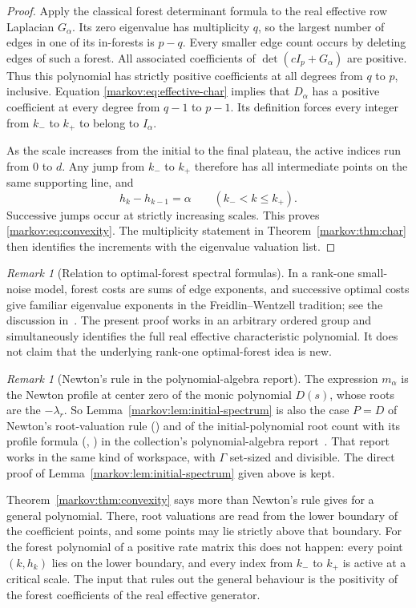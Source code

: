 \documentclass[11pt]{article}
\numberwithin{equation}{section}
\theoremstyle{definition}
\theoremstyle{remark}
\newtheorem{remark}[theorem]{Remark}
\begin{document}
\begin{proof}
Apply the classical forest determinant formula to the real effective row
Laplacian $G_\alpha$. Its zero eigenvalue has multiplicity $q$, so the largest
number of edges in one of its in-forests is $p-q$. Every smaller edge count
occurs by deleting edges of such a forest. All associated coefficients of
$\det(cI_p+G_\alpha)$ are positive. Thus this polynomial has strictly positive
coefficients at all degrees from $q$ to $p$, inclusive. Equation
\eqref{markov:eq:effective-char} implies that $D_\alpha$ has a positive coefficient
at every degree from $q-1$ to $p-1$. Its definition forces every integer from
$k_-$ to $k_+$ to belong to $I_\alpha$.

As the scale increases from the initial to the final plateau, the active indices
run from $0$ to $d$. Any jump from $k_-$ to $k_+$ therefore has all intermediate
points on the same supporting line, and
\[
 h_k-h_{k-1}=\alpha\qquad(k_-<k\le k_+).
\]
Successive jumps occur at strictly increasing scales. This proves
\eqref{markov:eq:convexity}. The multiplicity statement in Theorem~\ref{markov:thm:char}
then identifies the increments with the eigenvalue valuation list.
\end{proof}

\begin{remark}[Relation to optimal-forest spectral formulas]
In a rank-one small-noise model, forest costs are sums of edge exponents, and
successive optimal costs give familiar eigenvalue exponents in the
Freidlin--Wentzell tradition; see the discussion in~\cite{GC}. The present proof
works in an arbitrary ordered group and simultaneously identifies the full
real effective characteristic polynomial. It does not claim that the underlying
rank-one optimal-forest idea is new.
\end{remark}

\begin{remark}[Newton's rule in the polynomial-algebra report]\label{markov:rem:newton}
The expression $m_\alpha$ is the Newton profile at center zero of the monic
polynomial $D(s)$, whose roots are the $-\lambda_r$. So
Lemma~\ref{markov:lem:initial-spectrum} is also the case $P=D$ of Newton's
root-valuation rule () and of the initial-polynomial
root count with its profile formula (,
) in the collection's polynomial-algebra
report~\cite{CollPoly}. That report works in the same kind of workspace, with
$\Gamma$ set-sized and divisible. The direct proof of
Lemma~\ref{markov:lem:initial-spectrum} given above is kept.

Theorem~\ref{markov:thm:convexity} says more than Newton's rule gives for a
general polynomial. There, root valuations are read from the lower boundary of
the coefficient points, and some points may lie strictly above that boundary.
For the forest polynomial of a positive rate matrix this does not happen: every
point $(k,h_k)$ lies on the lower boundary, and every index from $k_-$ to $k_+$
is active at a critical scale. The input that rules out the general behaviour is
the positivity of the forest coefficients of the real effective generator.
\end{remark}
\end{document}
